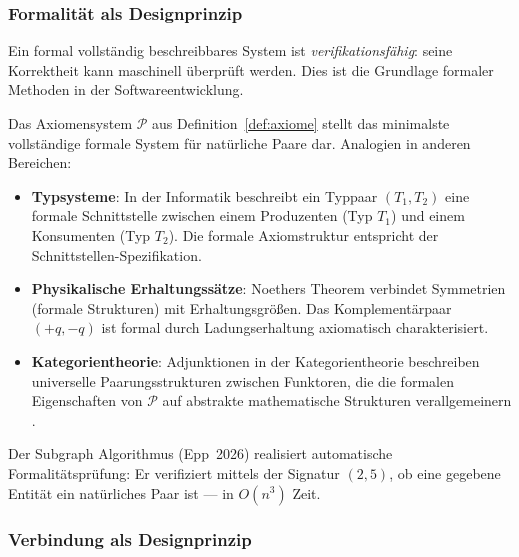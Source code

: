 ﻿\documentclass[a4paper,12pt]{article}
\theoremstyle{definition}
\begin{document}
\subsubsection*{Formalität als Designprinzip}

Ein formal vollständig beschreibbares System ist \emph{verifikations\-fähig}:
seine Korrektheit kann maschinell überprüft werden. Dies ist die Grundlage formaler
Methoden in der Softwareentwicklung.

Das Axiomensystem $\mathcal{P}$ aus Definition~\ref{def:axiome} stellt das minimalste
vollständige formale System für natürliche Paare dar.
Analogien in anderen Bereichen:
\begin{itemize}
	\item \textbf{Typsysteme}: In der Informatik beschreibt ein Typpaar $(T_1, T_2)$
	eine formale Schnittstelle zwischen einem Produzenten (Typ $T_1$) und einem
	Konsumenten (Typ $T_2$). Die formale Axiomstruktur entspricht der
	Schnittstellen-Spezifikation.
	\item \textbf{Physikalische Erhaltungssätze}: Noethers Theorem verbindet
	Symmetrien (formale Strukturen) mit Erhaltungsgrößen. Das Komplementärpaar
	$(+q, -q)$ ist formal durch Ladungserhaltung axiomatisch charakterisiert.
	\item \textbf{Kategorientheorie}: Adjunktionen in der Kategorientheorie
	beschreiben universelle Paarungsstrukturen zwischen Funktoren, die die
	formalen Eigenschaften von $\mathcal{P}$ auf abstrakte mathematische
	Strukturen verallgemeinern \cite{weyl1952}.
\end{itemize}

Der Subgraph Algorithmus (Epp~2026) realisiert automatische Formalitätsprüfung:
Er verifiziert mittels der Signatur $(2, 5)$, ob eine gegebene Entität ein
natürliches Paar ist --- in $O(n^3)$ Zeit.

\subsubsection*{Verbindung als Designprinzip}
\end{document}
